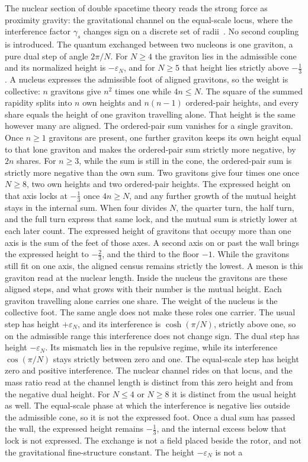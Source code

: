 \documentclass[a4paper]{article}
\begin{document}
The nuclear section of double spacetime theory reads the strong force as proximity gravity: the gravitational channel on the equal-scale locus, where the interference factor \(\gamma_s\) changes sign on a discrete set of radii~\cite{dst-main}. No second coupling is introduced. The quantum exchanged between two nucleons is one graviton, a pure dual step of angle \(2\pi/N\). For \(N\ge 4\) the graviton lies in the admissible cone and its normalized height is \(-\varepsilon_N\), and for \(N\ge 5\) that height lies strictly above \(-\frac13\). A nucleus expresses the admissible foot of aligned gravitons, so the weight is collective: \(n\) gravitons give \(n^2\) times one while \(4n\le N\). The square of the summed rapidity splits into \(n\) own heights and \(n(n-1)\) ordered-pair heights, and every share equals the height of one graviton travelling alone. That height is the same however many are aligned. The ordered-pair sum vanishes for a single graviton. Once \(n\ge 1\) gravitons are present, one further graviton keeps its own height equal to that lone graviton and makes the ordered-pair sum strictly more negative, by \(2n\) shares. For \(n\ge 3\), while the sum is still in the cone, the ordered-pair sum is strictly more negative than the own sum. Two gravitons give four times one once \(N\ge 8\), two own heights and two ordered-pair heights. The expressed height on that axis locks at \(-\frac13\) once \(4n\ge N\), and any further growth of the mutual height stays in the internal sum. When four divides \(N\), the quarter turn, the half turn, and the full turn express that same lock, and the mutual sum is strictly lower at each later count. The expressed height of gravitons that occupy more than one axis is the sum of the feet of those axes. A second axis on or past the wall brings the expressed height to \(-\frac23\), and the third to the floor \(-1\). While the gravitons still fit on one axis, the aligned census remains strictly the lowest. A meson is this graviton read at the nuclear length. Inside the nucleus the gravitons are these aligned steps, and what grows with their number is the mutual height. Each graviton travelling alone carries one share. The weight of the nucleus is the collective foot. The same angle does not make these roles one carrier. The usual step has height \(+\varepsilon_N\), and its interference is \(\cosh(\pi/N)\), strictly above one, so on the admissible range this interference does not change sign. The dual step has height \(-\varepsilon_N\). Its mismatch lies in the repulsive regime, while its interference \(\cos(\pi/N)\) stays strictly between zero and one. The equal-scale step has height zero and positive interference. The nuclear channel rides on that locus, and the mass ratio read at the channel length is distinct from this zero height and from the negative dual height. For \(N\le 4\) or \(N\ge 8\) it is distinct from the usual height as well. The equal-scale phase at which the interference is negative lies outside the admissible cone, so it is not the expressed foot. Once a dual sum has passed the wall, the expressed height remains \(-\frac13\), and the internal excess below that lock is not expressed. The exchange is not a field placed beside the rotor, and not the gravitational fine-structure constant. The height \(-\varepsilon_N\) is not a 
\end{document}
